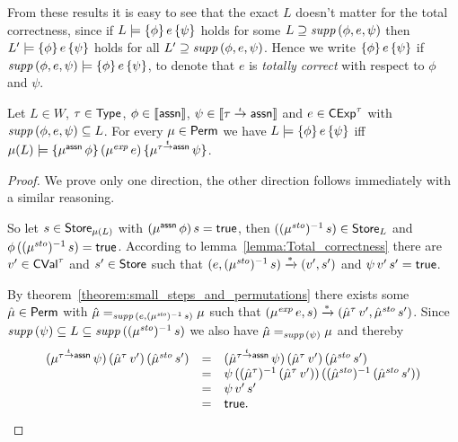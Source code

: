 \documentclass[12pt,a4paper]{report}
\newcommand{\CExp}{\sstyle{CExp}}
\newcommand{\CVal}{\sstyle{CVal}}
\newcommand{\sexp}{\nstyle{exp}}
\newcommand{\ssto}{\nstyle{sto}}
\begin{document}
From these results it is easy to see that the exact $L$ doesn't matter for the total correctness, since
if $L\models\{\phi\}\,e\,\{\psi\}$ holds for some $L \supseteq \mathit{supp}\,(\phi,e,\psi)$
then $L'\models\{\phi\}\,e\,\{\psi\}$ holds for all $L'\supseteq \mathit{supp}\,(\phi,e,\psi)$.
Hence we write $\{\phi\}\,e\,\{\psi\}$ if $\mathit{supp}\,(\phi,e,\psi)\models\{\phi\}\,e\,\{\psi\}$,
to denote that $e$ is {\em totally correct} with respect to $\phi$ and $\psi$. 

\begin{lemma} \label{lemma:Permutations_and_total_correctness}
  Let $L \in W$, $\tau \in \mathsf{Type}$, $\phi \in \llbracket\mathsf{assn}\rrbracket$,
  $\psi \in \llbracket\tau\stackrel{_t}{\to}\mathsf{assn}\rrbracket$ and $e \in \CExp^\tau$ with $\mathit{supp}\,(\phi,e,\psi) \subseteq L$.
  For every $\mu \in \mathsf{Perm}$ we have $L\models\{\phi\}\,e\,\{\psi\}$ iff
  $\mu(L) \models \triple{\mu^\tassn\,\phi}{(\mu^\sexp\,e)}{\mu^{\ttarrow{\tau}{\tassn}}\,\psi}$.
\end{lemma}

\begin{proof}
  We prove only one direction, the other direction follows immediately with a similar reasoning.

  So let $s \in \mathsf{Store}_{\mu(L)}$ with $(\mu^{\mathsf{assn}}\,\phi)\,s = \mathsf{true}$, then
  $((\mu^\ssto)^{-1}\,s) \in \Store_L$ and $\phi\,((\mu^\ssto)^{-1}\,s)=\true$.
  According to lemma~\ref{lemma:Total_correctness} there are $v' \in \CVal^\tau$
  and $s' \in \mathsf{Store}$ such that
  $(e,(\mu^\ssto)^{-1}\,s) \xrightarrow* (v',s')$ and $\psi\,v'\,s' = \mathsf{true}$.

  By theorem~\ref{theorem:small_steps_and_permutations} there exists some
  $\hat{\mu}\in\mathsf{Perm}$ with $\hat{\mu} =_{\supp{e,(\mu^\ssto)^{-1}\,s}} \mu$ such that
  $(\mu^\sexp\,e,s) \xrightarrow* (\hat{\mu}^\tau\,v',\hat{\mu}^\ssto\,s')$.
  Since $\supp{\psi} \subseteq L \subseteq \supp{(\mu^\ssto)^{-1}\,s}$ we also have
  $\hat{\mu} =_{\mathit{supp}\,(\psi)} \mu$ and thereby
  \[\begin{array}{rcl}
    (\mu^{\ttarrow{\tau}{\tassn}}\,\psi)\,(\hat{\mu}^\tau\,v')\,(\hat{\mu}^\ssto\,s')
    &=& (\hat{\mu}^{\ttarrow{\tau}{\tassn}}\,\psi)\,(\hat{\mu}^\tau\,v')\,(\hat{\mu}^\ssto\,s') \\
    &=& \psi\,((\hat{\mu}^\tau)^{-1}\,(\hat{\mu}^\tau\,v'))\,
              ((\hat{\mu}^\ssto)^{-1}\,(\hat{\mu}^\ssto\,s')) \\
    &=& \psi\,v'\,s' \\
    &=& \true.
  \end{array}\]
\end{proof}
\end{document}
